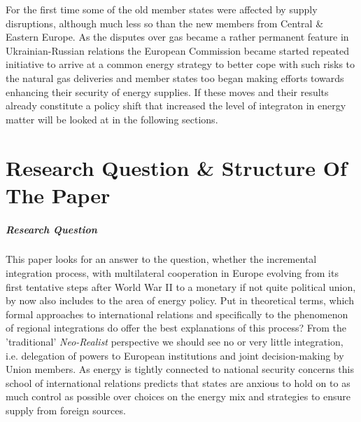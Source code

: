 \documentclass[11pt,a4paper,english]{scrreprt}
\begin{document}
For the first time some of the old member states were affected by supply
disruptions, although much less so than the new members from Central \& Eastern
Europe. As the disputes over gas became a rather permanent feature in
Ukrainian-Russian relations the European Commission became started repeated
initiative to arrive at a common energy strategy to better cope with such risks
to the natural gas deliveries and member states too began making efforts
towards enhancing their security of energy supplies. If these moves and
their results already constitute a policy shift that increased the level of
integraton in energy matter will be looked at in the following sections.\par






\chapter{Research Question \& Structure Of The Paper}


      \paragraph{Research Question}

This paper looks for an answer to the question, whether the incremental
integration process, with multilateral cooperation in Europe evolving
from its first tentative steps after World War II to a monetary if not quite
political union, by now also includes to the area of energy policy. Put in
theoretical terms, which formal approaches to international relations and
specifically to the phenomenon of regional integrations do offer the best
explanations of this process? From the 'traditional' \emph{Neo-Realist}
perspective we should see no or very little integration, i.e. delegation of
powers to European institutions and joint decision-making by Union members. As
energy is tightly connected to national security concerns this school of
international relations predicts that states are anxious to hold on to as much
control as possible over choices on the energy mix and strategies to ensure
supply from foreign sources.\par
\end{document}
